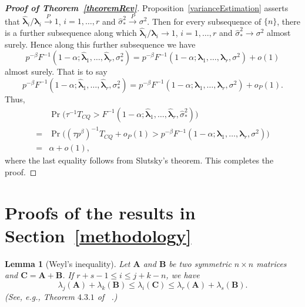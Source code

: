 \documentclass[times,sort&compress,3p]{elsarticle}
\newcommand{\BA}{\mathbf{A}}    \newcommand{\BB}{\mathbf{B}}    \newcommand{\BC}{\mathbf{C}}    \newcommand{\BD}{\mathbf{D}}    \newcommand{\BE}{\mathbf{E}}    \newcommand{\BF}{\mathbf{F}}    \newcommand{\BG}{\mathbf{G}}    \newcommand{\BH}{\mathbf{H}}    \newcommand{\BI}{\mathbf{I}}    \newcommand{\BJ}{\mathbf{J}}    \newcommand{\BK}{\mathbf{K}}    \newcommand{\BL}{\mathbf{L}}
\newcommand{\bfsym}[1]{\ensuremath{\boldsymbol{#1}}}
\def\blambda {\bfsym {\lambda}}        \def\bLambda {\bfsym {\Lambda}}
\theoremstyle{plain}
\newtheorem{corollary}{\quad\quad Corollary}
\newtheorem{lemma}{\quad\quad Lemma}
\theoremstyle{definition}
\theoremstyle{remark}
\begin{document}
\begin{appendices}
\begin{proof}[\textbf{Proof of Theorem~\ref{theoremRev}}]
    Proposition~\ref{varianceEstimation} asserts that $\hat{\blambda}_i/\blambda_i\xrightarrow{P} 1$, $i=1,\ldots,r$ and $\hat{\sigma}_*^2\xrightarrow{P} \sigma^2$.
    Then for every subsequence of $\{n\}$, there is a further subsequence along which $\hat{\blambda}_i/\blambda_i\to 1$, $i=1,\ldots,r$ and $\hat{\sigma}_*^2\to \sigma^2$ almost surely.
    Hence along this further subsequence we have
    $$
        p^{-\beta}F^{-1}(1-\alpha;\hat{\blambda}_1,\ldots,\hat{\blambda}_r,\sigma_{*}^2)=
        p^{-\beta}F^{-1}(1-\alpha;\blambda_1,\ldots,\blambda_r,\sigma^2)+o(1)
    $$
    almost surely.
    That is to say
    $$
        p^{-\beta}F^{-1}(1-\alpha;\hat{\blambda}_1,\ldots,\hat{\blambda}_r,\sigma_{*}^2)=
        p^{-\beta}F^{-1}(1-\alpha;\blambda_1,\ldots,\blambda_r,\sigma^2)+o_P(1).
    $$
    Thus,
    $$
    \begin{aligned}
        &\Pr\big(\tau^{-1}T_{CQ} > F^{-1}(1-\alpha;\hat{\blambda}_1,\ldots,\hat{\blambda}_r,\hat{\sigma}_*^2)\big)
        \\
        =&
    \Pr\big((\tau p^{\beta})^{-1}T_{CQ} +o_P(1) > p^{-\beta}F^{-1}(1-\alpha;\blambda_1,\ldots,\blambda_r,\sigma^2)\big)
        \\
        =& \alpha +o(1),
    \end{aligned}
    $$
    where the last equality follows from Slutsky's theorem.
    This completes the proof.
\end{proof}




\section{Proofs of the results in Section~\ref{methodology}}\label{appendixB}

\begin{lemma}[Weyl's inequality]
Let $\BA$ and $\BB$ be two symmetric $n\times n$ matrices and $\BC=\BA+\BB$. If $r+s-1 \leq  i\leq j+k-n$, we have
\begin{equation*}
\lambda_j(\BA)+\lambda_k(\BB)\leq \lambda_i(\BC) \leq \lambda_r(\BA)+\lambda_s(\BB).
\end{equation*}
    (See, e.g., Theorem $4.3.1$ of ~\cite{Horn1985Matrix}.)
\end{lemma}


\end{appendices}
\end{document}
